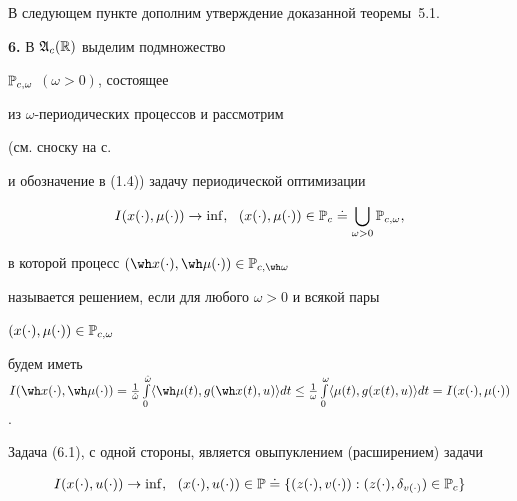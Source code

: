 В следующем пункте дополним утверждение доказанной теоремы~5.1.


\medskip


\addtocounter{section}{1}


\setcounter{equation}{0}


\setcounter{thms}{0}


\setcounter{lems}{0}


\setcounter{cors}{0}


\setcounter{notes}{0}


\setcounter{defns}{0}





{\bf 6.} В $\frak A_c(\Bbb R)$ выделим подмножество


$\Bbb P_{c,\omega}$ $(\omega>0)$, состоящее


из $\omega$-периодических процессов и рассмотрим


(см. сноску на с.\,\pageref{ftnt6}    %


и обозначение в (1.4)) задачу периодической оптимизации


\begin{equation}


I(x(\cdot),\mu(\cdot))\to\inf,\ \ (x(\cdot),\mu(\cdot))


\in\Bbb P_c\doteq


\bigcup_{\omega>0}\Bbb P_{c,\omega},


\end{equation}


в которой процесс $(\wh x(\cdot),\wh\mu(\cdot))


\in\Bbb P_{c,\wh\omega}$


называется решением, если для любого $\omega>0$ и всякой пары


$(x(\cdot),\mu(\cdot))\in\Bbb P_{c,\omega}$


будем иметь $I(\wh x(\cdot),\wh\mu(\cdot))=


\frac{1}{\Hat\omega}\int\limits_0^{\Hat\omega}


\langle\wh\mu(t),g(\wh x(t),u)\rangle dt\le


\frac{1}{\omega}\int\limits_0^\omega


\langle\mu(t),g(x(t),u)\rangle dt=I(x(\cdot),\mu(\cdot))$.


Задача (6.1), с одной стороны, является овыпуклением (расширением) задачи


\begin{equation}


I(x(\cdot),u(\cdot))\to\inf,\ \ (x(\cdot),u(\cdot))\in\Bbb P\doteq


\{(z(\cdot),v(\cdot)):(z(\cdot),\delta_{v(\cdot)})\in\Bbb P_c\}


\end{equation}


